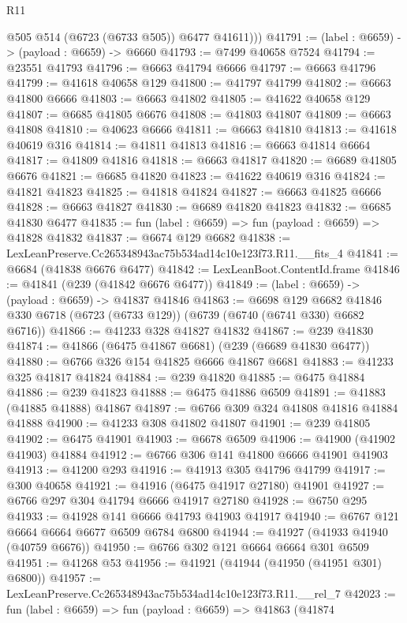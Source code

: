 \begin{lexlean}{R11}
\begin{coremodule}
          @505
          @514
          (@6723 (@6733 @505))
          @6477
          @41611)))
@41791 := (label : @6659) -> (payload : @6659) -> @6660
@41793 := @7499 @40658 @7524
@41794 := @23551 @41793
@41796 := @6663 @41794 @6666
@41797 := @6663 @41796
@41799 := @41618 @40658 @129
@41800 := @41797 @41799
@41802 := @6663 @41800 @6666
@41803 := @6663 @41802
@41805 := @41622 @40658 @129
@41807 := @6685 @41805 @6676
@41808 := @41803 @41807
@41809 := @6663 @41808
@41810 := @40623 @6666
@41811 := @6663 @41810
@41813 := @41618 @40619 @316
@41814 := @41811 @41813
@41816 := @6663 @41814 @6664
@41817 := @41809 @41816
@41818 := @6663 @41817
@41820 := @6689 @41805 @6676
@41821 := @6685 @41820
@41823 := @41622 @40619 @316
@41824 := @41821 @41823
@41825 := @41818 @41824
@41827 := @6663 @41825 @6666
@41828 := @6663 @41827
@41830 := @6689 @41820 @41823
@41832 := @6685 @41830 @6477
@41835 := fun (label : @6659) => fun (payload : @6659) => @41828 @41832
@41837 := @6674 @129 @6682
@41838 := LexLeanPreserve.Cc265348943ac75b534ad14c10e123f73.R11.__fits_4
@41841 := @6684 (@41838 @6676 @6477)
@41842 := LexLeanBoot.ContentId.frame
@41846 := @41841 (@239 (@41842 @6676 @6477))
@41849 := (label : @6659) -> (payload : @6659) -> @41837 @41846
@41863 := @6698
    @129
    @6682
    @41846
    @330
    @6718
    (@6723 (@6733 @129))
    (@6739 (@6740 (@6741 @330) @6682 @6716))
@41866 := @41233 @328 @41827 @41832
@41867 := @239 @41830
@41874 := @41866 (@6475 @41867 @6681) (@239 (@6689 @41830 @6477))
@41880 := @6766 @326 @154 @41825 @6666 @41867 @6681
@41883 := @41233 @325 @41817 @41824
@41884 := @239 @41820
@41885 := @6475 @41884
@41886 := @239 @41823
@41888 := @6475 @41886 @6509
@41891 := @41883 (@41885 @41888) @41867
@41897 := @6766 @309 @324 @41808 @41816 @41884 @41888
@41900 := @41233 @308 @41802 @41807
@41901 := @239 @41805
@41902 := @6475 @41901
@41903 := @6678 @6509
@41906 := @41900 (@41902 @41903) @41884
@41912 := @6766 @306 @141 @41800 @6666 @41901 @41903
@41913 := @41200 @293
@41916 := @41913 @305 @41796 @41799
@41917 := @300 @40658
@41921 := @41916 (@6475 @41917 @27180) @41901
@41927 := @6766 @297 @304 @41794 @6666 @41917 @27180
@41928 := @6750 @295
@41933 := @41928 @141 @6666 @41793 @41903 @41917
@41940 := @6767 @121 @6664 @6664 @6677 @6509 @6784 @6800
@41944 := @41927 (@41933 @41940 (@40759 @6676))
@41950 := @6766 @302 @121 @6664 @6664 @301 @6509
@41951 := @41268 @53
@41956 := @41921 (@41944 (@41950 (@41951 @301) @6800))
@41957 := LexLeanPreserve.Cc265348943ac75b534ad14c10e123f73.R11.__rel_7
@42023 := fun (label : @6659) =>
  fun (payload : @6659) =>
  @41863
    (@41874

\end{coremodule}
\end{lexlean}
